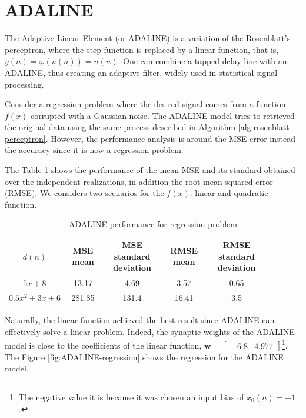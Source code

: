 \documentclass[12pt,a4paper]{article}
\begin{document}
\section{ADALINE}

The Adaptive Linear Element (or ADALINE) is a variation of the Rosenblatt's perceptron, where the step function is replaced by a linear function, that is, \(y(n) = \varphi(u(n)) = u(n)\). One can combine a tapped delay line with an ADALINE, thus creating an adaptive filter, widely used in statistical signal processing.

Consider a regression problem where the desired signal comes from a function \(f(x)\) corrupted with a Gaussian noise. The ADALINE model tries to retrieved the original data using the same process described in Algorithm \ref{alg:rosenblatt-perceptron}. However, the performance analysis is around the MSE error instead the accuracy since it is now a regression problem.

The Table \ref{tab:adaline-results} shows the performance of the mean MSE and its standard obtained over the independent realizations, in addition the root mean squared error (RMSE). We considers two scenarios for the \(f (x)\): linear and quadratic function.

\begin{table}[H]
	\centering
	\caption{ADALINE performance for regression problem}
	\footnotesize
	\setlength{\tabcolsep}{5pt}
	\begin{tabular}{ccccccccc}
		\hline
		\(d(n)\) & MSE mean & MSE standard deviation & RMSE mean & RMSE standard deviation \\
		\hline
		\(5x+8\) & 13.17 & 4.69 & 3.57 & 0.65  \\
        \hline
		\(0.5x^2+3x+6\) & 281.85 & 131.4 & 16.41 & 3.5 \\
		\hline
	\end{tabular} \label{tab:adaline-results}
\end{table}

Naturally, the linear function achieved the best result since ADALINE can effectively solve a linear problem. Indeed, the synaptic weights of the ADALINE model is close to the coefficients of the linear function, \(\mathbf{w} = \begin{bmatrix}
    -6.8 & 4.977
\end{bmatrix}\)\footnote{The negative value it is because it was chosen an input bias of \(x_0(n)=-1\).}. The Figure \ref{fig:ADALINE-regression} shows the regression for the ADALINE model.
\end{document}
